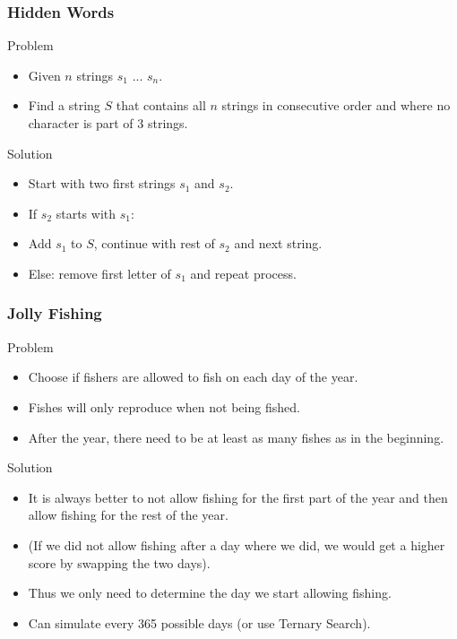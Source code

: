 \documentclass{beamer}
\begin{document}
\begin{frame}
    \frametitle{Hidden Words}
    \begin{block}{Problem}
        \begin{itemize}
            \item Given $n$ strings $s_1$ ... $s_n$.
            \item Find a string $S$ that contains all $n$ strings in consecutive order and where no character is part of 3 strings.
        \end{itemize}
    \end{block} \pause
    \begin{block}{Solution}
        \begin{itemize}
            \item Start with two first strings $s_1$ and $s_2$.
            \pause
            \item If $s_2$ starts with $s_1$:
            \pause
            \item Add $s_1$ to $S$, continue with rest of $s_2$ and next string.
            \pause
            \item Else: remove first letter of $s_1$ and repeat process.
        \end{itemize}
    \end{block} 
\end{frame}

\begin{frame}
    \frametitle{Jolly Fishing}
    \begin{block}{Problem}
        \begin{itemize}
            \item Choose if fishers are allowed to fish on each day of the year.
            \item Fishes will only reproduce when not being fished.
            \item After the year, there need to be at least as many fishes as in the beginning.
        \end{itemize}
    \end{block} \pause
    \begin{block}{Solution}
        \begin{itemize}
            \item It is always better to not allow fishing for the first part of the year and then allow fishing for the rest of the year.
            \pause
            \item (If we did not allow fishing after a day where we did, we would get a higher score by swapping the two days).
            \pause
            \item Thus we only need to determine the day we start allowing fishing.
            \pause
            \item Can simulate every 365 possible days (or use Ternary Search).
        \end{itemize}
    \end{block} 
\end{frame}
\end{document}
